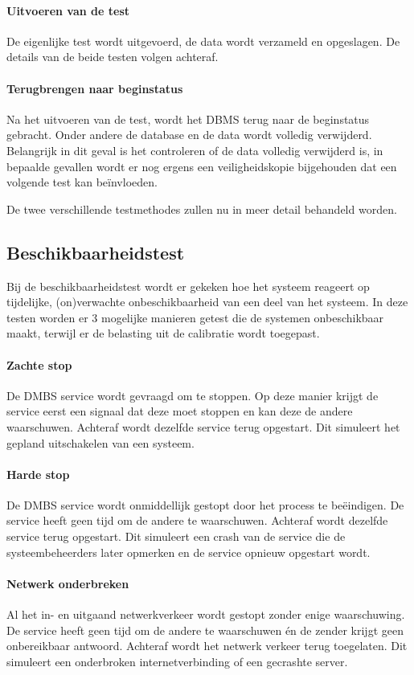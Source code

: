 \paragraph{Uitvoeren van de test} De eigenlijke test wordt uitgevoerd, de data wordt verzameld en opgeslagen. De details van de beide testen volgen achteraf. 

\paragraph{Terugbrengen naar beginstatus} Na het uitvoeren van de test, wordt het DBMS terug naar de beginstatus gebracht. Onder andere de database en de data wordt volledig verwijderd. Belangrijk in dit geval is het controleren of de data volledig verwijderd is, in bepaalde gevallen wordt er nog ergens een veiligheidskopie bijgehouden dat een volgende test kan beïnvloeden. 

De twee verschillende testmethodes zullen nu in meer detail behandeld worden. 
\subsection{Beschikbaarheidstest}
Bij de beschikbaarheidstest wordt er gekeken hoe het systeem reageert op tijdelijke, (on)verwachte onbeschikbaarheid van een deel van het systeem. In deze testen worden er 3 mogelijke manieren getest die de systemen onbeschikbaar maakt, terwijl er de belasting uit de calibratie wordt toegepast. 

\paragraph{Zachte stop} De DMBS service wordt gevraagd om te stoppen. Op deze manier krijgt de service eerst een signaal dat deze moet stoppen en kan deze de andere waarschuwen. Achteraf wordt dezelfde service terug opgestart. Dit simuleert het gepland uitschakelen van een systeem. 

\paragraph{Harde stop} De DMBS service wordt onmiddellijk gestopt door het process te beëindigen. De service heeft geen tijd om de andere te waarschuwen. Achteraf wordt dezelfde service terug opgestart. Dit simuleert een crash van de service die de systeembeheerders later opmerken en de service opnieuw opgestart wordt. 

\paragraph{Netwerk onderbreken} Al het in- en uitgaand netwerkverkeer wordt gestopt zonder enige waarschuwing. De service heeft geen tijd om de andere te waarschuwen én de zender krijgt geen onbereikbaar antwoord. Achteraf wordt het netwerk verkeer terug toegelaten. Dit simuleert een onderbroken internetverbinding of een gecrashte server.  


